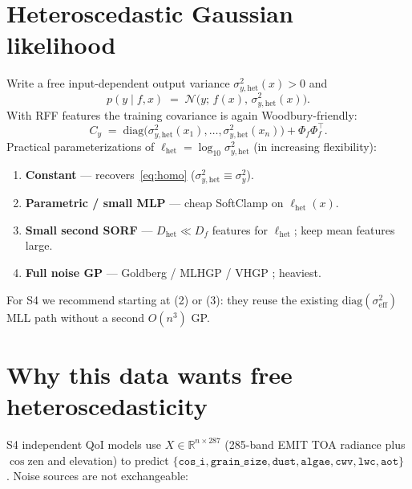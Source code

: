 \documentclass[11pt]{article}
\newcommand{\sigy}{\sigma_{y}^{2}}%
\newcommand{\sighet}{\sigma_{y,\mathrm{het}}^{2}}%
\newcommand{\sigeff}{\sigma_{\mathrm{eff}}^{2}}%
\newcommand{\Phif}{\Phi_{f}}%
\newcommand{\Cy}{C_{y}}%
\begin{document}
\section{Heteroscedastic Gaussian likelihood}
\label{sec:hetero-lik}

Write a free input-dependent output variance $\sighet(x)>0$ and
\begin{equation}
\label{eq:hetero-lik}
  p(y\mid f,x)
  \;=\;
  \mathcal N\bigl(y;\,f(x),\,\sighet(x)\bigr).
\end{equation}
With RFF features the training covariance is again Woodbury-friendly:
\begin{equation}
\label{eq:hetero-woodbury}
  \Cy
  \;=\;
  \mathrm{diag}\bigl(\sighet(x_1),\ldots,\sighet(x_n)\bigr)
  +
  \Phif\Phif^{\top}.
\end{equation}
Practical parameterizations of $\ell_{\mathrm{het}}=\log_{10}\sighet$ (in increasing flexibility):
\begin{enumerate}[leftmargin=1.2em,itemsep=0.2em]
  \item \textbf{Constant} --- recovers~\eqref{eq:homo} ($\sighet\equiv\sigy$).
  \item \textbf{Parametric / small MLP} --- cheap SoftClamp on $\ell_{\mathrm{het}}(x)$.
  \item \textbf{Small second SORF} --- $D_{\mathrm{het}}\ll D_f$ features for $\ell_{\mathrm{het}}$;
        keep mean features large.
  \item \textbf{Full noise GP} --- Goldberg / MLHGP / VHGP
        \cite{goldberg1998heteroscedastic,kersting2007mlhgp,lazaro2011vhgp}; heaviest.
\end{enumerate}
For S4 we recommend starting at (2) or (3): they reuse the existing
$\mathrm{diag}(\sigeff)$ MLL path without a second $O(n^3)$ GP.

\section{Why this data wants free heteroscedasticity}

S4 independent QoI models use $X\in\mathbb{R}^{n\times 287}$ (285-band EMIT TOA radiance
plus $\cos\mathrm{zen}$ and elevation) to predict
$\{\texttt{cos\_i},\texttt{grain\_size},\texttt{dust},\texttt{algae},\texttt{cwv},\texttt{lwc},\texttt{aot}\}$
\cite{thompson2020emit,Bohn03172025}.
Noise sources are not exchangeable:
\end{document}
